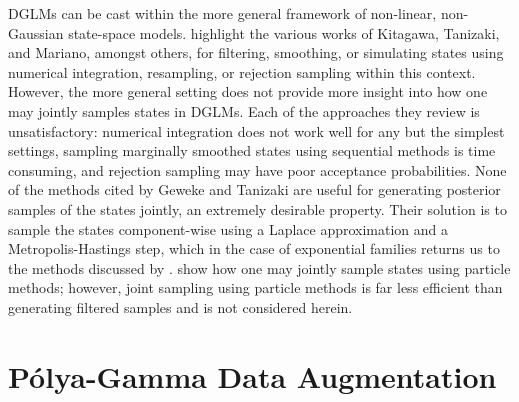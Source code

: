 \documentclass[11pt]{article}
\newcommand{\Polya}{P\'{o}lya}
\begin{document}
DGLMs can be cast within the more general framework of non-linear, non-Gaussian
state-space models.  \cite{geweke-tanizaki-2001} highlight the various works of
Kitagawa, Tanizaki, and Mariano, amongst others, for filtering, smoothing, or
simulating states using numerical integration, resampling, or rejection sampling
within this context.  However, the more general setting does not provide more
insight into how one may jointly samples states in DGLMs.  Each of the
approaches they review is unsatisfactory: numerical integration does not work
well for any but the simplest settings, sampling marginally smoothed states
using sequential methods is time consuming, and rejection sampling may have poor
acceptance probabilities.  None of the methods cited by Geweke and Tanizaki are
useful for generating posterior samples of the states jointly, an extremely
desirable property.  Their solution is to sample the states component-wise using
a Laplace approximation and a Metropolis-Hastings step, which in the case of
exponential families returns us to the methods discussed by
\citep{gamerman-1998}.  \cite{godsill-etal-2004} show how one may jointly sample
states using particle methods; however, joint sampling using particle methods is
far less efficient than generating filtered samples and is not considered
herein.

\section{\Polya-Gamma Data Augmentation}
\end{document}
